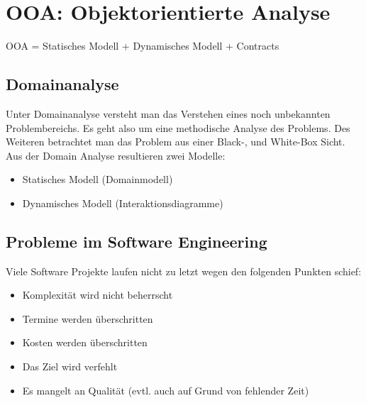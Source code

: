 


\newcommand{\SUBJECT}{Zusammenfassung}
\newcommand{\TITLE}{Software Engineering 1}





\section{OOA: Objektorientierte Analyse}
OOA = Statisches Modell + Dynamisches Modell + Contracts

\subsection{Domainanalyse}
Unter Domainanalyse versteht man das Verstehen eines noch unbekannten Problembereichs. Es geht also um eine methodische Analyse des Problems. Des Weiteren betrachtet man das Problem aus einer Black-, und White-Box Sicht. Aus der Domain Analyse resultieren zwei Modelle:
\begin{itemize}
	\item Statisches Modell (Domainmodell)
	\item Dynamisches Modell (Interaktionsdiagramme)
\end{itemize}

\subsection{Probleme im Software Engineering}
Viele Software Projekte laufen nicht zu letzt wegen den folgenden Punkten schief:
\begin{itemize}
	\item Komplexität wird nicht beherrscht
	\item Termine werden überschritten
	\item Kosten werden überschritten
	\item Das Ziel wird verfehlt
	\item Es mangelt an Qualität (evtl. auch auf Grund von fehlender Zeit)
\end{itemize}


